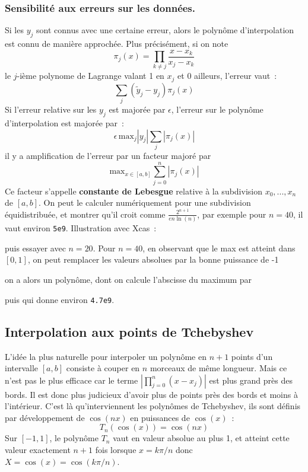 \documentclass[a4paper,11pt]{article}
\begin{document}
\begin{giacjshere}
\subsubsection{Sensibilit\'e aux erreurs sur les donn\'ees.}
Si les $y_j$ sont connus avec une certaine erreur, alors le polyn\^ome 
d'interpolation est connu de mani\`ere approch\'ee. Plus
pr\'ecis\'ement, si on note
$$ \pi_j(x)=\prod_{k \neq j} \frac{x-x_k}{x_j-x_k}$$
le $j$-i\`eme polynome de Lagrange valant 1 en $x_j$ et 0 ailleurs,
l'erreur vaut~:
$$ \sum_j (\tilde{y}_j-y_j) \pi_j(x) $$
Si l'erreur relative sur les $y_j$ est major\'ee par $\epsilon$,
l'erreur sur le polyn\^ome d'interpolation est major\'ee par~:
$$ \epsilon \, \mbox{max}_j|y_j| \sum_j |\pi_j(x)| $$
il y a amplification de l'erreur par un facteur major\'e par~
$$ \mbox{max}_{x \in [a,b]} \sum_{j=0}^n |\pi_j(x)| $$
Ce facteur s'appelle {\bf constante de Lebesgue} relative \`a la
subdivision $x_0,...,x_n$ de $[a,b]$. On peut le calculer
num\'eriquement pour une subdivision \'equidistribu\'ee,
et montrer qu'il croit comme $\frac{2^{n+1}}{e n \ln(n)}$,
par exemple pour $n=40$, il vaut environ {\tt 5e9}.
Illustration avec Xcas~:\\


puis essayer avec $n=20$. Pour $n=40$, en observant que le max
est atteint dans $[0,1]$, on peut remplacer les valeurs absolues
par la bonne puissance de -1\\

on a alors un polyn\^ome, dont on calcule l'abscisse du maximum par\\

puis  qui donne environ {\tt 4.7e9}.


\subsection{Interpolation aux points de Tchebyshev}
L'id\'ee la plus naturelle pour interpoler un polyn\^ome en $n+1$
points d'un intervalle $[a,b]$ consiste \`a couper en $n$ morceaux
de m\^eme longueur. Mais ce n'est pas le plus efficace car le
terme $|\prod_{j=0}^n(x-x_j)|$ est plus grand pr\`es des bords. Il est
donc plus judicieux d'avoir plus de points pr\`es des bords et moins
\`a l'int\'erieur. C'est l\`a qu'interviennent les polyn\^omes de
Tchebyshev, ils sont d\'efinis par d\'eveloppement de $\cos(nx)$
en puissances de $\cos(x)$~:
$$ T_n(\cos(x))=\cos(nx) $$
Sur $[-1,1]$, le polyn\^ome $T_n$ vaut en valeur absolue au plus 1, et
atteint cette valeur exactement $n+1$ fois lorsque $x=k\pi/n$ donc 
$X=\cos(x)=\cos(k\pi/n)$.\\


\end{giacjshere}
\end{document}
